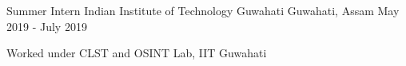 
\begin{cventries}
  \cventry
    {Summer Intern} %
    {Indian Institute of Technology Guwahati} %
    {Guwahati, Assam} %
    {May 2019 - July 2019} %
    {
      \begin{cvitems} %
        \item {Worked under CLST and OSINT Lab, IIT Guwahati}
      \end{cvitems}
    }    
\end{cventries}
